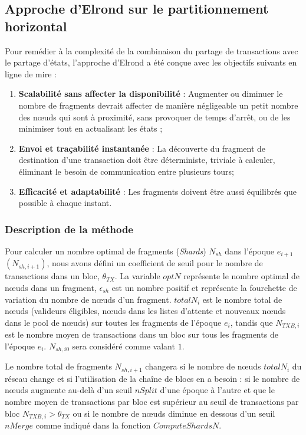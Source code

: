 \documentclass[journal]{IEEEtran}
\begin{document}
\subsection{Approche d'Elrond sur le partitionnement horizontal}
\label{Scala4}
Pour remédier à la complexité de la combinaison du partage de transactions avec le partage d’états, l'approche d'Elrond a été conçue avec les objectifs suivants en ligne de mire :
\begin{enumerate}
 \item \textbf{Scalabilité sans affecter la disponibilité} : Augmenter ou diminuer le nombre de fragments devrait affecter de manière négligeable un petit nombre des nœuds qui sont à proximité, sans provoquer de temps d'arrêt, ou de les minimiser tout en actualisant les états ;
 \item \textbf{Envoi et traçabilité instantanée} : La découverte du fragment de destination d'une transaction doit être déterministe, triviale à calculer, éliminant le besoin de communication entre plusieurs tours;
 \item \textbf{Efficacité et adaptabilité} : Les fragments doivent être aussi équilibrés que possible à chaque instant.
\end{enumerate}

\subsubsection{Description de la méthode}
Pour calculer un nombre optimal de fragments (\textit{Shards}) ${N}_{sh}$ dans l'époque ${e}_{i+1}$  $({N}_{sh,i+1})$, nous avons défini un coefficient de seuil pour le nombre de transactions dans un bloc, ${\theta}_{TX}$. La variable $optN$ représente le nombre optimal de nœuds dans un fragment, ${\epsilon}_{sh}$ est un nombre positif et représente la fourchette de variation du nombre de nœuds d'un fragment. ${totalN}_{i}$  est le nombre total de nœuds (valideurs éligibles, nœuds dans les listes d'attente et nouveaux nœuds dans le pool de nœuds) sur toutes les fragments de l'époque ${e}_{i}$, tandis que ${N}_{TXB,i}$ est le nombre moyen de transactions dans un bloc sur tous les fragments de l'époque ${e}_{i}$. ${N}_{sh,i0}$ sera considéré comme valant $1$.

Le nombre total de fragments ${N}_{sh,i+1}$ changera si le nombre de nœuds ${totalN}_{i}$ du réseau change et si l’utilisation de la chaîne de blocs en a besoin : si le nombre de nœuds augmente au-delà d'un seuil $nSplit$ d'une époque à l'autre et que le nombre moyen de transactions par bloc est supérieur au seuil de transactions par bloc ${N}_{TXB,i}>{\theta}_{TX}$ ou si le nombre de nœuds diminue en dessous d'un seuil $nMerge$ comme indiqué dans la fonction $ComputeShardsN$.
\end{document}
